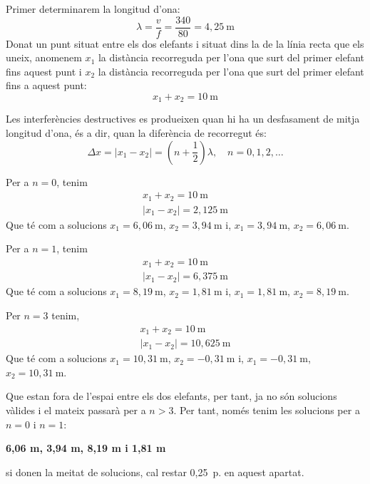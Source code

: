 \begin{solapartat}
 Primer determinarem la longitud d'ona:
\[ \lambda = \frac{v}{f} = \frac{340}{80} = 4,25\ \mathrm{m} \]
 Donat un punt situat entre els dos elefants i situat dins la de la línia recta que els uneix, anomenem $x_1$ la distància recorreguda per l'ona que surt del primer elefant fins aquest punt i $x_2$ la distància recorreguda per l'ona que surt del primer elefant fins a aquest punt:
\[ x_1 + x_2 = 10\ \mathrm{m} \]

 Les interferències destructives es produeixen quan hi ha un desfasament de mitja longitud d'ona, és a dir, quan la diferència de recorregut és:
\[ \Delta x = |x_1 - x_2| = \left(n + \frac{1}{2}\right)\lambda, \quad n = 0,1,2,\ldots \]

 Per a $n = 0$, tenim
\begin{gather*} x_1 + x_2 = 10\ \mathrm{m}\\ |x_1 - x_2| = 2,125\ \mathrm{m} \end{gather*}
Que té com a solucions $x_1 = 6,06\ \mathrm{m}$, $x_2 = 3,94\ \mathrm{m}$ i, $x_1 = 3,94\ \mathrm{m}$, $x_2 = 6,06\ \mathrm{m}$.

Per a $n = 1$, tenim
\begin{gather*} x_1 + x_2 = 10\ \mathrm{m}\\ |x_1 - x_2| = 6,375\ \mathrm{m} \end{gather*}
Que té com a solucions $x_1 = 8,19\ \mathrm{m}$, $x_2 = 1,81\ \mathrm{m}$ i, $x_1 = 1,81\ \mathrm{m}$, $x_2 = 8,19\ \mathrm{m}$.

Per $n = 3$ tenim,
\begin{gather*} x_1 + x_2 = 10\ \mathrm{m}\\ |x_1 - x_2| = 10,625\ \mathrm{m} \end{gather*}
Que té com a solucions $x_1 = 10,31\ \mathrm{m}$, $x_2 = -0,31\ \mathrm{m}$ i, $x_1 = -0,31\ \mathrm{m}$, $x_2 = 10,31\ \mathrm{m}$.

Que estan fora de l'espai entre els dos elefants, per tant, ja no són solucions vàlides i el mateix passarà per a $n > 3$. Per tant, només tenim les solucions per a $n = 0$ i $n = 1$:
\begin{center}\textbf{6,06 m, 3,94 m, 8,19 m i 1,81 m}\end{center}

 si donen la meitat de solucions, cal restar 0,25~p. en aquest apartat.
\end{solapartat}
